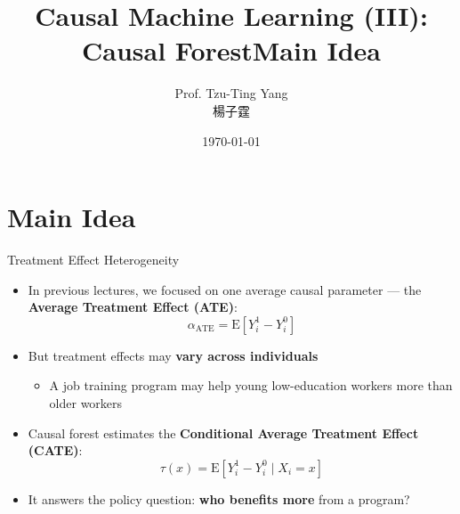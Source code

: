 \documentclass[hyperref={pdfpagelabels=false}]{beamer}
\title[Causal Forest]{Causal Machine Learning (III): Causal Forest}
\author 
{Prof. Tzu-Ting Yang  \\ 楊子霆}
\institute{Institute of Economics, Academia Sinica  \\ 中央研究院經濟研究所}
\date
{\today}
\begin{document}
\begin{frame}
  \titlepage
\end{frame}

\title[]
{Main Idea}

\subtitle{}
\author{}
\institute{}
\date{}

\begin{frame}{}
  \titlepage
\end{frame}

\section{Main Idea}

\begin{frame}{Treatment Effect Heterogeneity}{}
\begin{itemize}
  \item In previous lectures, we focused on one average causal parameter --- the \textbf{Average Treatment Effect (ATE)}:
  \[
    \alpha_{\text{ATE}} = \mathrm{E}\!\left[Y_i^1 - Y_i^0\right]
  \]
  \vspace{0.2cm}
  \item But treatment effects may \textbf{vary across individuals} 
  \vspace{0.2cm}
\begin{itemize}

  \item A job training program may help young low-education workers more than older workers
 \end{itemize}
 
  \vspace{0.2cm}
  \item Causal forest estimates the \textbf{Conditional Average Treatment Effect (CATE)}:
  \[
    \tau(x) = \mathrm{E}\!\left[Y_i^1 - Y_i^0 \mid X_i = x\right]
  \]
  \vspace{0.2cm}
  \item It answers the policy question: \textbf{who benefits more} from a program?
\end{itemize}
\end{frame}
\end{document}
